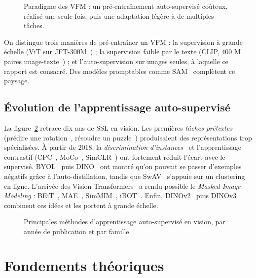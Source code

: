 \documentclass[11pt,a4paper]{article}
\begin{document}
\begin{figure}[ht]
  \centering
  \resizebox{0.92\textwidth}{!}{}
  \caption{Paradigme des VFM : un pré-entraînement auto-supervisé coûteux, réalisé une seule fois, puis une adaptation légère à de multiples tâches.}
  \label{fig:paradigme}
\end{figure}

On distingue trois manières de pré-entraîner un VFM : la supervision à grande échelle (ViT sur JFT-300M~\citep{dosovitskiy2021vit}) ; la supervision faible par le texte (CLIP, 400 M paires image-texte~\citep{radford2021clip}) ; et l'auto-supervision sur images seules, à laquelle ce rapport est consacré. Des modèles promptables comme SAM~\citep{kirillov2023sam} complètent ce paysage.

\subsection{Évolution de l'apprentissage auto-supervisé}
La figure~\ref{fig:timeline} retrace dix ans de SSL en vision. Les premières \emph{tâches prétextes} (prédire une rotation~\citep{gidaris2018rotation}, résoudre un puzzle~\citep{noroozi2016jigsaw}) produisaient des représentations trop spécialisées. À partir de 2018, la \emph{discrimination d'instances}~\citep{wu2018instdisc} et l'apprentissage contrastif (CPC~\citep{oord2018cpc}, MoCo~\citep{he2020moco}, SimCLR~\citep{chen2020simclr}) ont fortement réduit l'écart avec le supervisé. BYOL~\citep{grill2020byol} puis DINO~\citep{caron2021dino} ont montré qu'on pouvait se passer d'exemples négatifs grâce à l'auto-distillation, tandis que SwAV~\citep{caron2020swav} s'appuie sur un clustering en ligne. L'arrivée des Vision Transformers~\citep{dosovitskiy2021vit} a rendu possible le \emph{Masked Image Modeling} : BEiT~\citep{bao2022beit}, MAE~\citep{he2022mae}, SimMIM~\citep{xie2022simmim}, iBOT~\citep{zhou2022ibot}. Enfin, DINOv2~\citep{oquab2024dinov2} puis DINOv3~\citep{simeoni2025dinov3} combinent ces idées et les portent à grande échelle.

\begin{figure}[ht]
  \centering
  \resizebox{\textwidth}{!}{}
  \caption{Principales méthodes d'apprentissage auto-supervisé en vision, par année de publication et par famille.}
  \label{fig:timeline}
\end{figure}

\section{Fondements théoriques}
\end{document}
